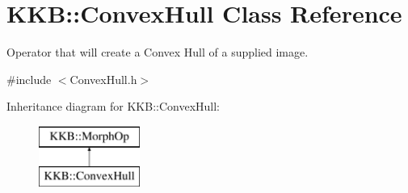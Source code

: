 \hypertarget{class_k_k_b_1_1_convex_hull}{}\section{K\+KB\+:\+:Convex\+Hull Class Reference}
\label{class_k_k_b_1_1_convex_hull}


Operator that will create a Convex Hull of a supplied image.  




{\ttfamily \#include $<$Convex\+Hull.\+h$>$}

Inheritance diagram for K\+KB\+:\+:Convex\+Hull\+:\begin{figure}[H]
\begin{center}
\leavevmode
\includegraphics[height=2.000000cm]{class_k_k_b_1_1_convex_hull}
\end{center}
\end{figure}
